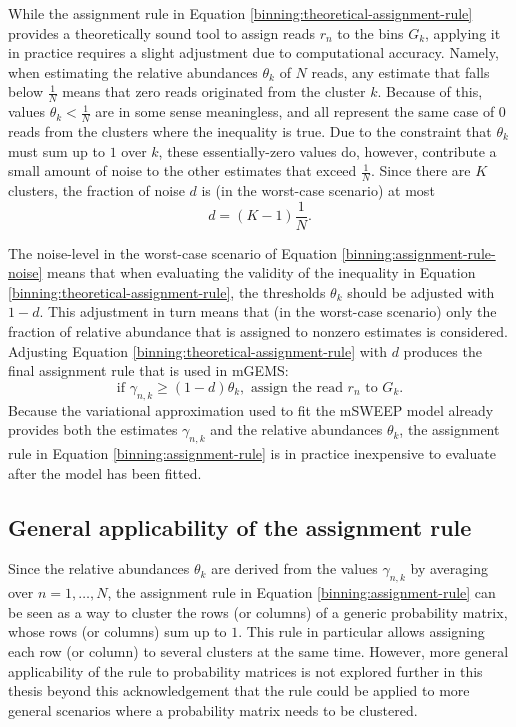 \documentclass[officiallayout]{tktla}
\begin{document}
While the assignment rule in Equation
\ref{binning:theoretical-assignment-rule} provides a theoretically
sound tool to assign reads $r_{n}$ to the bins $G_{k}$, applying it in
practice requires a slight adjustment due to computational
accuracy. Namely, when estimating the relative abundances $\theta_{k}$
of $N$ reads, any estimate that falls below $\frac{1}{N}$ means that
zero reads originated from the cluster $k$. Because of this, values
$\theta_{k} < \frac{1}{N}$ are in some sense meaningless, and all
represent the same case of 0 reads from the clusters where the
inequality is true. Due to the constraint that $\theta_{k}$ must sum
up to $1$ over $k$, these essentially-zero values do, however,
contribute a small amount of noise to the other estimates that exceed
$\frac{1}{N}$. Since there are $K$ clusters, the fraction of noise $d$
is (in the worst-case scenario) at most
\begin{equation}
  \label{binning:assignment-rule-noise}
  d = (K - 1)\frac{1}{N}.
\end{equation}

The noise-level in the worst-case scenario of Equation
\ref{binning:assignment-rule-noise} means that when evaluating the
validity of the inequality in Equation
\ref{binning:theoretical-assignment-rule}, the thresholds $\theta_k$
should be adjusted with $1 - d$. This adjustment in turn means that
(in the worst-case scenario) only the fraction of relative abundance
that is assigned to nonzero estimates is considered. Adjusting
Equation \ref{binning:theoretical-assignment-rule} with $d$ produces
the final assignment rule that is used in mGEMS:
\begin{equation}
  \label{binning:assignment-rule}
  \text{if } \gamma_{n, k} \geq (1 - d)\theta_{k}, \text{ assign the read } r_{n} \text{ to } G_{k}.
\end{equation}
Because the variational approximation used to fit the mSWEEP model
already provides both the estimates $\gamma_{n, k}$ and the relative
abundances $\theta_{k}$, the assignment rule in Equation
\ref{binning:assignment-rule} is in practice inexpensive to
evaluate after the model has been fitted.

\subsection{General applicability of the assignment rule}

Since the relative abundances $\theta_k$ are derived from the values
$\gamma_{n, k}$ by averaging over $n = 1, \dots, N$, the assignment
rule in Equation \ref{binning:assignment-rule} can be seen as a way to
cluster the rows (or columns) of a generic probability matrix, whose
rows (or columns) sum up to $1$. This rule in particular allows
assigning each row (or column) to several clusters at the same
time. However, more general applicability of the rule to probability
matrices is not explored further in this thesis beyond this
acknowledgement that the rule could be applied to more general
scenarios where a probability matrix needs to be clustered.
\end{document}
